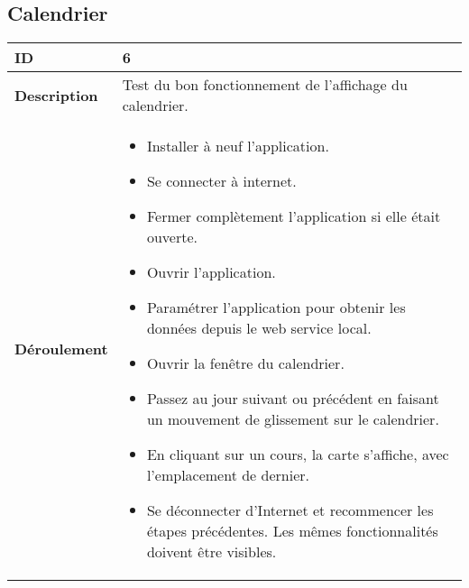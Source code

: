 		\subsection{Calendrier}
					 \begin{longtable}{m{4cm}|p{10cm}|}
					 \textbf{ ID} & 6 \\
					 \hline \textbf{Description} & Test du bon fonctionnement de l'affichage du calendrier.\\
					 \hline \textbf{Déroulement} &
						 \begin{itemize}
						  	\item Installer à neuf l'application.
						  	\item Se connecter à internet.
							 \item Fermer complètement l'application si elle était ouverte.
							 \item Ouvrir l'application.
							 \item Paramétrer l'application pour obtenir les données depuis le web service local.
							 \item Ouvrir la fenêtre du calendrier.
							 \item Passez au jour suivant ou précédent en faisant un mouvement de glissement sur le calendrier.
							 \item En cliquant sur un cours, la carte s'affiche, avec l'emplacement de dernier. 
							\item Se déconnecter d'Internet et recommencer les étapes précédentes. Les mêmes fonctionnalités doivent être visibles.
						 \end{itemize}
					 \\
				 \end{longtable}

